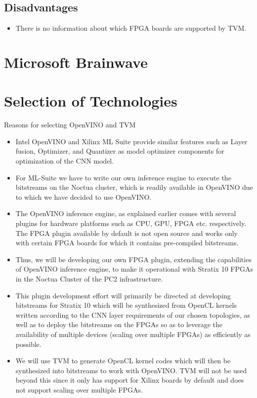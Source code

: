  \subsection{Disadvantages}
 \begin{itemize}
 \item There is no information about which FPGA boards are supported by TVM.
 \end{itemize}
\pagebreak
 \section{Microsoft Brainwave}
 
 \section{Selection of Technologies}
Reasons for selecting OpenVINO and TVM
 \begin{itemize}
 \item Intel OpenVINO and Xilinx ML Suite provide similar features such as Layer fusion, Optimizer, and Quantizer as model optimizer components for optimization of the CNN model. 
 \item For ML-Suite we have to write our own inference engine  to execute the bitstreams on the Noctua cluster, which is readily available in OpenVINO due to which we have decided to use OpenVINO.
 \item The OpenVINO inference engine, as explained earlier comes with several plugins for hardware platforms such as CPU, GPU, FPGA etc. respectively. The FPGA plugin available by default is not open source and works only with certain FPGA boards for which it contains pre-compiled bitstreams. 
 \item Thus, we will be developing our own FPGA plugin, extending the capabilities of OpenVINO inference engine, to make it operational with Stratix 10 FPGAs in the Noctua Cluster of the PC2 infrastructure. 
 \item This plugin development effort will primarily be directed at developing bitstreams for Stratix 10 which will be synthesized from OpenCL kernels written according to the CNN layer requirements of our chosen topologies, as well as to deploy the bitstreams on the FPGAs so as to leverage the availability of multiple devices (scaling over multiple FPGAs) as efficiently as possible.    
 \item We will use TVM to generate OpenCL kernel codes which will then be synthesized into bitstreams to work with OpenVINO. TVM will not be used beyond this since it only has support for Xilinx boards by default and does not support scaling over multiple FPGAs.

 \end{itemize}